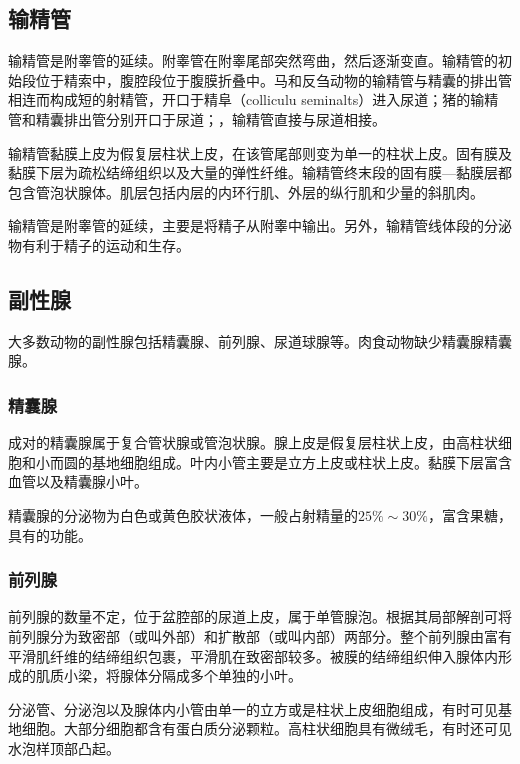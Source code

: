 \subsection{输精管}

输精管是附睾管的延续。附睾管在附睾尾部突然弯曲，然后逐渐变直。输精管的初始段位于精索中，腹腔段位于腹膜折叠中。马和反刍动物的输精管与精囊的排出管相连而构成短的射精管，开口于精阜（colliculu seminalts）进入尿道；猪的输精管和精囊排出管分别开口于尿道；，输精管直接与尿道相接。

输精管黏膜上皮为假复层柱状上皮，在该管尾部则变为单一的柱状上皮。固有膜及黏膜下层为疏松结缔组织以及大量的弹性纤维。输精管终末段的固有膜---黏膜层都包含管泡状腺体。肌层包括内层的内环行肌、外层的纵行肌和少量的斜肌肉。

输精管是附睾管的延续，主要是将精子从附睾中输出。另外，输精管线体段的分泌物有利于精子的运动和生存。

\subsection{副性腺}

大多数动物的副性腺包括精囊腺、前列腺、尿道球腺等。肉食动物缺少精囊腺精囊腺。


\subsubsection{精囊腺}

成对的精囊腺属于复合管状腺或管泡状腺。腺上皮是假复层柱状上皮，由高柱状细胞和小而圆的基地细胞组成。叶内小管主要是立方上皮或柱状上皮。黏膜下层富含血管以及精囊腺小叶。

精囊腺的分泌物为白色或黄色胶状液体，一般占射精量的$ 25\%\sim 30\% $，富含果糖，具有的功能。

\subsubsection{前列腺}

前列腺的数量不定，位于盆腔部的尿道上皮，属于单管腺泡。根据其局部解剖可将前列腺分为致密部（或叫外部）和扩散部（或叫内部）两部分。整个前列腺由富有平滑肌纤维的结缔组织包裹，平滑肌在致密部较多。被膜的结缔组织伸入腺体内形成的肌质小梁，将腺体分隔成多个单独的小叶。

分泌管、分泌泡以及腺体内小管由单一的立方或是柱状上皮细胞组成，有时可见基地细胞。大部分细胞都含有蛋白质分泌颗粒。高柱状细胞具有微绒毛，有时还可见水泡样顶部凸起。

